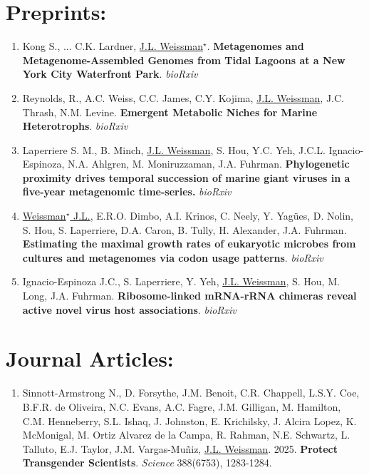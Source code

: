 \documentclass[]{res}
\begin{document}
\begin{resume}
 
 \section{Preprints:} \vspace{0mm}
  
 \begin{enumerate}[leftmargin=*]
 \setlength\itemsep{0.25em}
 
 \item Kong S., ... C.K. Lardner, \underline{J.L. Weissman$^\star$}. {\bf Metagenomes and Metagenome-Assembled Genomes from Tidal Lagoons at a New York City Waterfront Park}. \emph{bioRxiv}
 

\item Reynolds, R., A.C. Weiss, C.C. James, C.Y. Kojima, \underline{J.L. Weissman}, J.C. Thrash, N.M. Levine. {\bf Emergent Metabolic Niches for Marine Heterotrophs}. \emph{bioRxiv}

\item Laperriere S. M., B. Minch, \underline{J.L. Weissman}, S. Hou, Y.C. Yeh, J.C.L. Ignacio-Espinoza, N.A. Ahlgren, M. Moniruzzaman, J.A. Fuhrman. {\bf Phylogenetic proximity drives temporal succession of marine giant viruses in a five-year metagenomic time-series.} \emph{bioRxiv}

\item \underline{Weissman$^\star$ J.L.}, E.R.O. Dimbo, A.I. Krinos, C. Neely, Y. Yag\"{ues}, D. Nolin, S. Hou, S. Laperriere, D.A. Caron, B. Tully, H. Alexander, J.A. Fuhrman. {\bf Estimating the maximal growth rates of eukaryotic microbes from cultures and metagenomes via codon usage patterns}. \emph{bioRxiv}

\item Ignacio-Espinoza J.C., S. Laperriere, Y. Yeh, \underline{J.L. Weissman}, S. Hou, M. Long, J.A. Fuhrman. {\bf Ribosome-linked mRNA-rRNA chimeras reveal active novel virus host associations}. \emph{bioRxiv}
 

\end{enumerate} 

  
 \section{Journal Articles:} \vspace{0mm}
 
\begin{enumerate}[leftmargin=*]
 \setlength\itemsep{0.25em}
 
\item Sinnott-Armstrong N., D. Forsythe, J.M. Benoit, C.R. Chappell, L.S.Y. Coe, B.F.R. de Oliveira, N.C. Evans, A.C. Fagre, J.M. Gilligan, M. Hamilton, C.M. Henneberry, S.L. Ishaq, J. Johnston, E. Krichilsky, J. Alcira Lopez, K. McMonigal, M. Ortiz Alvarez de la Campa, R. Rahman, N.E. Schwartz, L. Talluto, E.J. Taylor, J.M. Vargas-Muñiz, \underline{J.L. Weissman}. 2025. {\bf Protect Transgender Scientists}. \emph{Science}  388(6753), 1283-1284.
 

\end{enumerate}
\end{resume}
\end{document}
